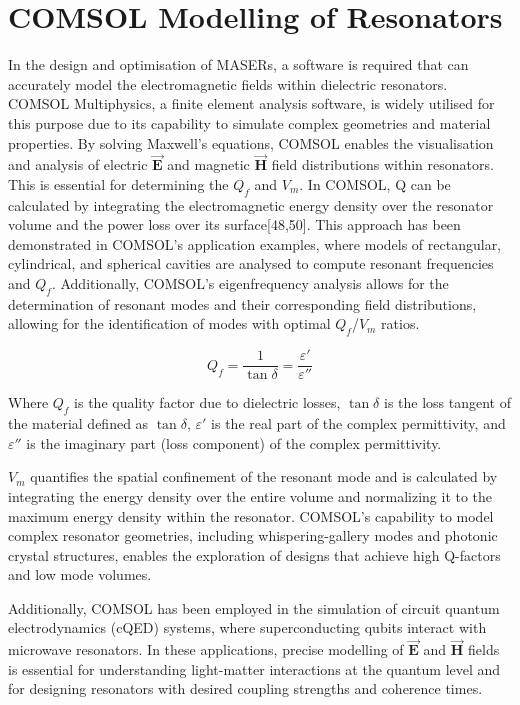 \section{COMSOL Modelling of Resonators}
\label{sec:section4}
In the design and optimisation of MASERs, a software is required that can
accurately model the electromagnetic fields within dielectric resonators. COMSOL
Multiphysics\textregistered{}, a finite element analysis software, is widely
utilised for this purpose due to its capability to simulate complex geometries
and material properties\autocite{comsol2020intro,comsol2020rf,comsol2024doc}. By
solving Maxwell's equations, COMSOL enables the visualisation and analysis of
electric $\vec{\mathbf{E}}$ and magnetic $\vec{\mathbf{H}}$ field distributions
within resonators. This is essential for determining the $Q_f$ and
$V_m$\autocite{zienkiewicz2013errors,}. In COMSOL, Q can be calculated by
integrating the electromagnetic energy density over the resonator volume and the
power loss over its surface[48,50]. This approach has been demonstrated in
COMSOL's application examples, where models of rectangular, cylindrical, and
spherical cavities are analysed to compute resonant frequencies and
$Q_f$\autocite{comsol2024doc}. Additionally, COMSOL's eigenfrequency analysis
allows for the determination of resonant modes and their corresponding field
distributions, allowing for the identification of modes with optimal $Q_f$/$V_m$
ratios.

\begin{equation}
  Q_f = \frac{1}{\tan \delta}=\frac{\varepsilon'}{\varepsilon''}
  \label{eq:Q}
\end{equation}

Where $Q_f$ is the quality factor due to dielectric losses, $\tan\delta$ is the
loss tangent of the material defined as $\tan\delta$, $\varepsilon'$ is the real
part of the complex permittivity, and $\varepsilon''$ is the imaginary part
(loss component) of the complex permittivity.

$V_m$ quantifies the spatial confinement of the resonant mode and is calculated
by integrating the energy density over the entire volume and normalizing it to
the maximum energy density within the resonator. COMSOL's capability to model
complex resonator geometries, including whispering-gallery modes and photonic
crystal structures, enables the exploration of designs that achieve high
Q-factors and low mode volumes.

Additionally, COMSOL has been employed in the simulation of circuit quantum
electrodynamics (cQED) systems, where superconducting qubits interact with
microwave resonators. In these applications, precise modelling of
$\vec{\mathbf{E}}$ and $\vec{\mathbf{H}}$ fields is essential for understanding
light-matter interactions at the quantum level and for designing resonators with
desired coupling strengths and coherence times\autocite{oxborrow2007traceable}.


